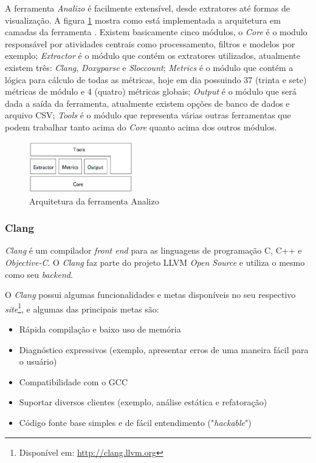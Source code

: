 A ferramenta \emph{Analizo} é facilmente extensível, desde extratores até formas de visualização. A figura \ref{archanalizo} mostra
como está implementada a arquitetura em camadas da ferramenta \cite{analizoartigo}. Existem basicamente cinco módulos, o 
\textit{Core} é o modulo responsável por atividades centrais como processamento, filtros e modelos por exemplo; 
\textit{Extractor} é o módulo que contém os extratores utilizados, atualmente existem três: \textit{Clang}, \textit{Doxyparse}
e \textit{Sloccount}; \textit{Metrics} é o módulo que contém a lógica para cálculo de todas as métricas, hoje em dia possuindo
37 (trinta e sete) métricas de módulo e 4 (quatro) métricas globais; \textit{Output} é o módulo que será dada a saída da 
ferramenta, atualmente existem opções de banco de dados e arquivo CSV; \textit{Tools} é o módulo que representa várias outras
ferramentas que podem trabalhar tanto acima do \textit{Core} quanto acima dos outros módulos.

\begin{figure}[h]
  \centering
  \includegraphics[width=0.4\textwidth]
      {figuras/analizo.eps}
  \caption{Arquitetura da ferramenta Analizo}
  \label{archanalizo}
\end{figure}

\subsubsection{Clang} \label{clang}

\emph{Clang} é um compilador \textit{front end} para as linguagens de
programação C, C++ e \textit{Objective-C}. O \emph{Clang} faz parte
do projeto LLVM \textit{Open Source} e utiliza o mesmo como seu \textit{backend}. 

O \emph{Clang} possui algumas funcionalidades e metas disponíveis no seu respectivo
\textit{site}\footnote{Disponível em: \url{http://clang.llvm.org}}, e
algumas das principais metas são:

\begin{itemize}
  \item Rápida compilação e baixo uso de memória
  \item Diagnóstico expressivos (exemplo, apresentar erros de uma maneira fácil para o usuário)
  \item Compatibilidade com o GCC
  \item Suportar diversos clientes (exemplo, análise estática e refatoração)
  \item Código fonte base simples e de fácil entendimento ("\textit{hackable}")
\end{itemize}

